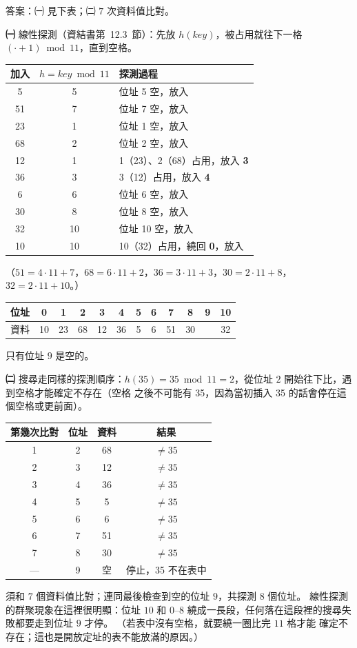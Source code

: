 \begin{pastsoln}
答案：㈠ 見下表；㈡ $7$ 次資料值比對。

\textbf{㈠} 線性探測（資結書第~12.3~節）：先放 $h(\mathit{key})$，被占用就往下一格 $(\cdot + 1) \bmod 11$，直到空格。
\begin{center}
\small
\begin{tabular}{ccl}
\toprule
加入 & $h = \mathit{key} \bmod 11$ & 探測過程 \\
\midrule
5 & 5 & 位址 5 空，放入 \\
51 & 7 & 位址 7 空，放入 \\
23 & 1 & 位址 1 空，放入 \\
68 & 2 & 位址 2 空，放入 \\
12 & 1 & 1（23）、2（68）占用，放入 \textbf{3} \\
36 & 3 & 3（12）占用，放入 \textbf{4} \\
6 & 6 & 位址 6 空，放入 \\
30 & 8 & 位址 8 空，放入 \\
32 & 10 & 位址 10 空，放入 \\
10 & 10 & 10（32）占用，繞回 \textbf{0}，放入 \\
\bottomrule
\end{tabular}
\end{center}
（$51 = 4 \cdot 11 + 7$，$68 = 6 \cdot 11 + 2$，$36 = 3 \cdot 11 + 3$，$30 = 2 \cdot 11 + 8$，$32 = 2 \cdot 11 + 10$。）
\begin{center}
\small
\begin{tabular}{c|ccccccccccc}
位址 & 0 & 1 & 2 & 3 & 4 & 5 & 6 & 7 & 8 & 9 & 10 \\
\hline
資料 & 10 & 23 & 68 & 12 & 36 & 5 & 6 & 51 & 30 & & 32 \\
\end{tabular}
\end{center}
只有位址 $9$ 是空的。

\textbf{㈡} 搜尋走同樣的探測順序：$h(35) = 35 \bmod 11 = 2$，從位址 $2$ 開始往下比，遇到空格才能確定不存在（空格
之後不可能有 35，因為當初插入 35 的話會停在這個空格或更前面）。
\begin{center}
\small
\begin{tabular}{cccc}
\toprule
第幾次比對 & 位址 & 資料 & 結果 \\
\midrule
1 & 2 & 68 & $\ne 35$ \\
2 & 3 & 12 & $\ne 35$ \\
3 & 4 & 36 & $\ne 35$ \\
4 & 5 & 5 & $\ne 35$ \\
5 & 6 & 6 & $\ne 35$ \\
6 & 7 & 51 & $\ne 35$ \\
7 & 8 & 30 & $\ne 35$ \\
--- & 9 & 空 & 停止，35 不在表中 \\
\bottomrule
\end{tabular}
\end{center}
須和 $7$ 個資料值比對；連同最後檢查到空的位址 $9$，共探測 $8$ 個位址。 線性探測的群聚現象在這裡很明顯：位址 $10$ 和
$0$--$8$ 繞成一長段，任何落在這段裡的搜尋失敗都要走到位址 $9$ 才停。 （若表中沒有空格，就要繞一圈比完 $11$ 格才能
確定不存在；這也是開放定址的表不能放滿的原因。）
\end{pastsoln}
